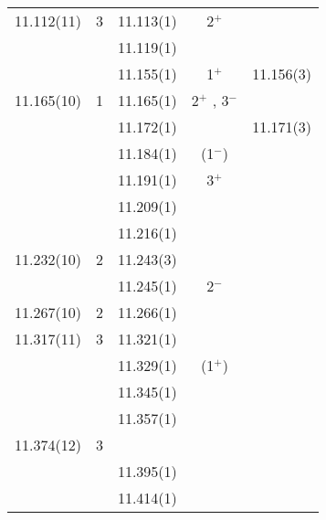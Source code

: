 \begin{center}
\begin{longtable}{cc cc c}
     11.112(11)        & 3        & 11.113(1)   &            2$^+$              &               \\
                       &          & 11.119(1)   &                               &               \\
                       &          & 11.155(1)   &            1$^+$              &    11.156(3)  \\
    11.165(10)         & 1        & 11.165(1)   &            2$^+$ ,  3$^-$     &               \\
                       &          & 11.172(1)   &                               &    11.171(3)  \\
                       &          & 11.184(1)   &            (1$^-$)            &               \\
                       &          & 11.191(1)   &            3$^+$              &               \\
                       &          & 11.209(1)   &                               &               \\
                       &          & 11.216(1)   &                               &               \\
    11.232(10)         & 2        & 11.243(3)   &                               &               \\
                       &          & 11.245(1)   &            2$^-$              &               \\
    11.267(10)         & 2        & 11.266(1)   &                               &               \\
    11.317(11)         & 3        & 11.321(1)   &                               &               \\
                       &          & 11.329(1)   &           (1$^+$)             &               \\
                       &          & 11.345(1)   &                               &               \\
                       &          & 11.357(1)   &                               &               \\
    11.374(12)         & 3        &             &                               &               \\
                       &          & 11.395(1)   &                               &               \\
                       &          & 11.414(1)   &                               &               \\

\end{longtable}
\end{center}
